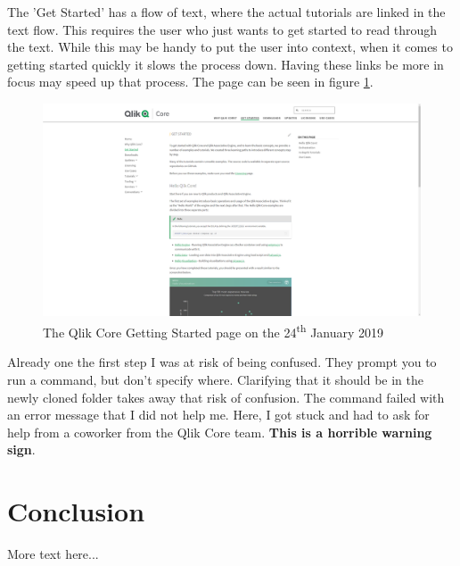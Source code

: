 \documentclass{article}
\begin{document}
The 'Get Started' has a flow of text, where the actual tutorials are linked in the text flow. This requires the user who just wants to get started to read through the text. While this may be handy to put the user into context, when it comes to getting started quickly it slows the process down. Having these links be more in focus may speed up that process. The page can be seen in figure \ref{fig:gettingstarted}.
\begin{figure}[H]
    \centering
    \includegraphics[width=\linewidth]{qlikCoreWebsite-GetStarted20190124.png}
    \caption{The Qlik Core Getting Started page on the 24\textsuperscript{th} January 2019}
    \label{fig:gettingstarted}
\end{figure}
Already one the first step I was at risk of being confused. They prompt you to run a command, but don't specify where. Clarifying that it should be in the newly cloned folder takes away that risk of confusion. The command failed with an error message that I did not help me. Here, I got stuck and had to ask for help from a coworker from the Qlik Core team. \textbf{This is a horrible warning sign}. 
\section{Conclusion}
More text here...
\newpage


\end{document}
